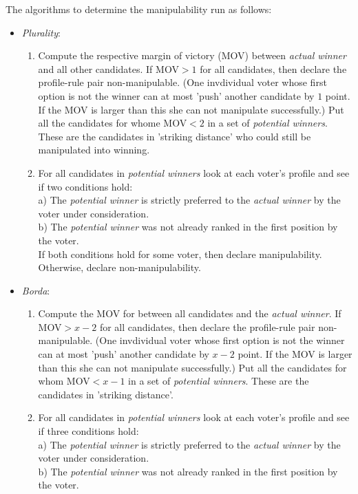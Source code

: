 \documentclass[10pt,a4paper]{article}
\begin{document}
	\noindent The algorithms to determine the manipulability run as follows:\\
	\begin{itemize}
		\item \textit{Plurality}: \begin{enumerate}
			\item  Compute the respective margin of victory (MOV) between \textit{actual winner} and all other candidates. If MOV$>1$ for all candidates, then declare the profile-rule pair non-manipulable. (One invdividual voter whose first option is not the winner can at most 'push' another candidate by $1$ point. If the MOV is larger than this she can not manipulate successfully.) Put all the candidates for whome MOV$<2$ in a set of \textit{potential winners}. These are the candidates in 'striking distance' who could still be manipulated into winning.
			\item For all candidates in \textit{potential winners} look at each voter's profile and see if two conditions hold: \\
			a) The \textit{potential winner} is strictly preferred to the \textit{actual winner} by the voter under consideration.\\
			b) The \textit{potential winner} was not already ranked in the first position by the voter.\\
			If both conditions hold for some voter, then declare manipulability. Otherwise, declare non-manipulability.
		\end{enumerate}
		\item \textit{Borda}: \begin{enumerate}
			\item Compute the MOV for between all candidates and the \textit{actual winner}. If MOV$>x-2$ for all candidates, then declare the profile-rule pair non-manipulable. (One invdividual voter whose first option is not the winner can at most 'push' another candidate by $x-2$ point. If the MOV is larger than this she can not manipulate successfully.) Put all the candidates for whom MOV$<x-1$ in a set of \textit{potential winners}. These are the candidates in 'striking distance'.
			\item For all candidates in \textit{potential winners} look at each voter's profile and see if three conditions hold: \\
			a) The \textit{potential winner} is strictly preferred to the \textit{actual winner} by the voter under consideration.\\
			b) The \textit{potential winner} was not already ranked in the first position by the voter.\\

\end{enumerate}
\end{itemize}
\end{document}
